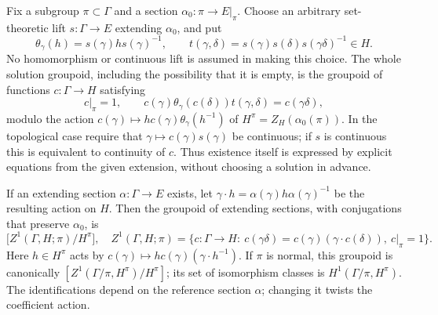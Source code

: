 \begin{theorem}\label{cat:J1}
Fix a subgroup $\pi\subset\Gamma$ and a section
$\alpha_0:\pi\to E|_\pi$.  Choose an arbitrary set-theoretic lift
$s:\Gamma\to E$ extending $\alpha_0$, and put
\[
 \theta_\gamma(h)=s(\gamma)h s(\gamma)^{-1},\qquad
 t(\gamma,\delta)=s(\gamma)s(\delta)s(\gamma\delta)^{-1}\in H.
\]
No homomorphism or continuous lift is assumed in making this choice.
The whole solution groupoid, including the possibility that it is empty,
is the groupoid of functions $c:\Gamma\to H$ satisfying
\[
 c|_\pi=1,\qquad
 c(\gamma)\theta_\gamma(c(\delta))t(\gamma,\delta)
       =c(\gamma\delta),
\]
modulo the action
$c(\gamma)\mapsto h c(\gamma)\theta_\gamma(h^{-1})$
of $H^\pi=Z_H(\alpha_0(\pi))$.
In the topological case require that
$\gamma\mapsto c(\gamma)s(\gamma)$ be continuous; if $s$ is
continuous this is equivalent to continuity of $c$.
Thus existence itself is expressed by explicit equations from the given
extension, without choosing a solution in advance.

If an extending section $\alpha:\Gamma\to E$ exists, let
$\gamma\cdot h=\alpha(\gamma)h\alpha(\gamma)^{-1}$ be the resulting action
on $H$.  Then the groupoid of extending sections, with conjugations that
preserve $\alpha_0$, is
\[
 \bigl[Z^1(\Gamma,H;\pi)/H^\pi\bigr],
 \quad
 Z^1(\Gamma,H;\pi)=
 \{c:\Gamma\to H:\ c(\gamma\delta)=c(\gamma)
       (\gamma\cdot c(\delta)),\ c|_\pi=1\}.
\]
Here $h\in H^\pi$ acts by
$c(\gamma)\mapsto h c(\gamma)(\gamma\cdot h^{-1})$.
If $\pi$ is normal, this groupoid is canonically
$[Z^1(\Gamma/\pi,H^\pi)/H^\pi]$; its set of isomorphism classes is
$H^1(\Gamma/\pi,H^\pi)$.  The identifications depend on the reference
section $\alpha$; changing it twists the coefficient action.
\end{theorem}
